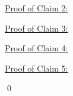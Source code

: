 \vskip 0.5cm
\noindent
\underline{Proof of Claim 2:}\quad

\vskip 0.5cm
\noindent
\underline{Proof of Claim 3:}\quad

\vskip 0.5cm
\noindent
\underline{Proof of Claim 4:}\quad

\vskip 0.5cm
\noindent
\underline{Proof of Claim 5:}\quad




\qed
